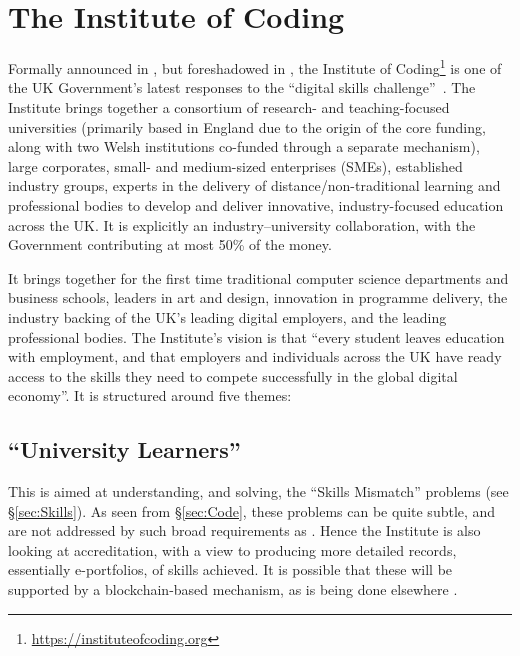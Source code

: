 \documentclass[sigconf,anonymous]{acmart}
\begin{document}
\section{The Institute of Coding}\label{ioc}

Formally announced in \cite{DfE2018a}, but foreshadowed in
\cite{HMG2015a}, the Institute of
Coding\footnote{\url{https://instituteofcoding.org}} is one of the UK
Government's latest responses to the ``digital skills
challenge''~\cite{davenport-et-al:cep2019}. The Institute brings
together a consortium of research- and teaching-focused universities
(primarily based in England due to the origin of the core funding,
along with two Welsh institutions co-funded through a separate
mechanism), large corporates, small- and medium-sized enterprises
(SMEs), established industry groups, experts in the delivery of
distance/non-traditional learning and professional bodies to develop
and deliver innovative, industry-focused education across the UK. It
is explicitly an industry--university collaboration, with the
Government contributing at most 50\% of the money.

It brings together for the first time traditional computer science
departments and business schools, leaders in art and design,
innovation in programme delivery, the industry backing of the UK's
leading digital employers, and the leading professional bodies.  The
Institute's vision is that ``every student leaves education with
employment, and that employers and individuals across the UK have
ready access to the skills they need to compete successfully in the
global digital economy''. It is structured around five themes:

\subsection{``University Learners''}

This is aimed at understanding, and solving, the ``Skills Mismatch''
problems (see \S\ref{sec:Skills}). As seen from \S\ref{sec:Code},
these problems can be quite subtle, and are not addressed by such broad
requirements as \cite[Requirement 2.3.1]{BCS2018a}.  Hence the
Institute is also looking at accreditation, with a view to producing
more detailed records, essentially e-portfolios, of skills
achieved. It is possible that these will be supported by a
blockchain-based mechanism, as is being done elsewhere
\cite{RMIT2018a}.
\end{document}
